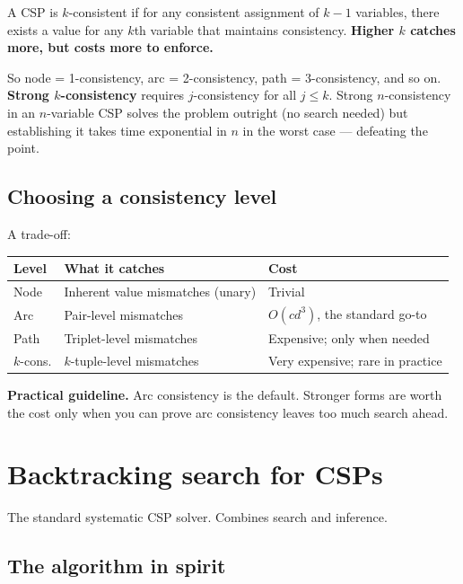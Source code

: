\documentclass[11pt, a4paper]{article}
\newcommand{\thead}[1]{\textbf{#1}}
\begin{document}
\begin{defbox}[$k$-consistency]
A CSP is $k$-consistent if for any consistent assignment of $k-1$ variables, there exists a value for any $k$th variable that maintains consistency. \textbf{Higher $k$ catches more, but costs more to enforce.}
\end{defbox}

So node = 1-consistency, arc = 2-consistency, path = 3-consistency, and so on. \textbf{Strong $k$-consistency} requires $j$-consistency for all $j \le k$. Strong $n$-consistency in an $n$-variable CSP solves the problem outright (no search needed) but establishing it takes time exponential in $n$ in the worst case — defeating the point.

\subsection{Choosing a consistency level}

A trade-off:

\begin{center}
\renewcommand{\arraystretch}{1.25}
\begin{tabular}{@{}p{3.5cm}p{4.5cm}p{6cm}@{}}
\toprule
\thead{Level} & \thead{What it catches} & \thead{Cost} \\
\midrule
Node     & Inherent value mismatches (unary) & Trivial \\
Arc      & Pair-level mismatches             & $O(c d^3)$, the standard go-to \\
Path     & Triplet-level mismatches          & Expensive; only when needed \\
$k$-cons. & $k$-tuple-level mismatches       & Very expensive; rare in practice \\
\bottomrule
\end{tabular}
\end{center}

\textbf{Practical guideline.} Arc consistency is the default. Stronger forms are worth the cost only when you can prove arc consistency leaves too much search ahead.

\section{Backtracking search for CSPs}

The standard systematic CSP solver. Combines search and inference.

\subsection{The algorithm in spirit}
\end{document}
